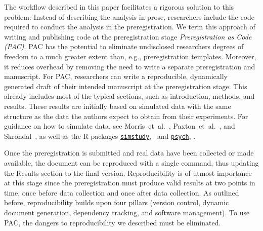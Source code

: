 \documentclass[psych,tutorial,accept,moreauthors,pdftex]{Definitions/mdpi}
\begin{document}
\begin{paracol}{2}
The workflow described in this paper facilitates a rigorous solution to
this problem: Instead of describing the analysis in prose, researchers
include the code required to conduct the analysis in the
preregistration. We term this approach of writing and publishing code at
the preregistration stage \emph{Preregistration as Code (PAC)}. PAC has
the potential to eliminate undisclosed researchers degrees of freedom to
a much greater extent than, e.g., preregistration templates. Moreover,
it reduces overhead by removing the need to write a separate
preregistration and manuscript. For PAC, researchers can write a
reproducible, dynamically generated draft of their intended manuscript
at the preregistration stage. This already includes most of the typical
sections, such as introduction, methods, and results. These results are
initially based on simulated data with the same structure as the data
the authors expect to obtain from their experiments. For guidance on how
to simulate data, see Morris~et~al.~\citep{morrisUsingSimulationStudies2019},
Paxton~et~al.~\citep{paxtonMonteCarloExperiments2001}, and
Skrondal~\citep{skrondalDesignAnalysisMonte2000}, as well as the R packages
\href{https://cran.r-project.org/web/packages/simstudy/vignettes/simstudy.html}{\texttt{simstudy}},~\citep{simstudy} and
\href{https://personality-project.org/r/psych/help/sim.html}{\texttt{psych}},
\citep{psych}.

Once the preregistration is submitted and real data have been collected
or made available, the document can be reproduced with a single command,
thus updating the Results section to the final version. Reproducibility
is of utmost importance at this stage since the preregistration must
produce valid results at two points in time, once before data collection
and once after data collection. As outlined before, reproducibility
builds upon four pillars (version control, dynamic document generation,
dependency tracking, and software management). To use PAC, the dangers to
reproducibility we described must be eliminated.



\end{paracol}
\end{document}
